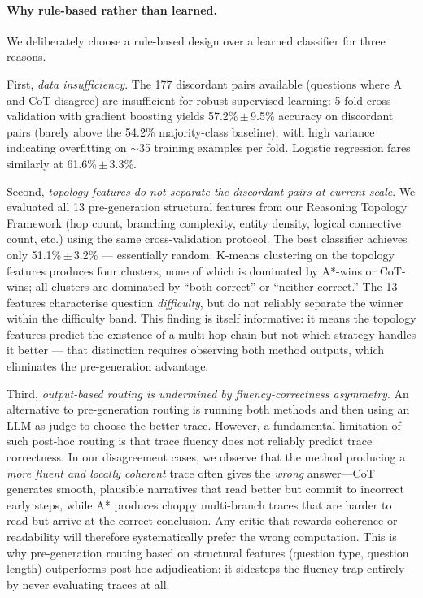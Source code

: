\documentclass{article}
\begin{document}
\paragraph{Why rule-based rather than learned.}
We deliberately choose a rule-based design over a learned classifier for three reasons.

First, \emph{data insufficiency}. The 177 discordant pairs available (questions where A\* and CoT disagree) are insufficient for robust supervised learning: 5-fold cross-validation with gradient boosting yields 57.2\%\,$\pm$\,9.5\% accuracy on discordant pairs (barely above the 54.2\% majority-class baseline), with high variance indicating overfitting on $\sim$35 training examples per fold. Logistic regression fares similarly at 61.6\%\,$\pm$\,3.3\%.

Second, \emph{topology features do not separate the discordant pairs at current scale}. We evaluated all 13 pre-generation structural features from our Reasoning Topology Framework (hop count, branching complexity, entity density, logical connective count, etc.) using the same cross-validation protocol. The best classifier achieves only 51.1\%\,$\pm$\,3.2\% --- essentially random. K-means clustering on the topology features produces four clusters, none of which is dominated by A*-wins or CoT-wins; all clusters are dominated by ``both correct'' or ``neither correct.'' The 13 features characterise question \emph{difficulty}, but do not reliably separate the winner within the difficulty band. This finding is itself informative: it means the topology features predict the existence of a multi-hop chain but not which strategy handles it better --- that distinction requires observing both method outputs, which eliminates the pre-generation advantage.

Third, \emph{output-based routing is undermined by fluency-correctness asymmetry}. An alternative to pre-generation routing is running both methods and then using an LLM-as-judge to choose the better trace. However, a fundamental limitation of such post-hoc routing is that trace fluency does not reliably predict trace correctness. In our disagreement cases, we observe that the method producing a \emph{more fluent and locally coherent} trace often gives the \emph{wrong} answer---CoT generates smooth, plausible narratives that read better but commit to incorrect early steps, while A* produces choppy multi-branch traces that are harder to read but arrive at the correct conclusion. Any critic that rewards coherence or readability will therefore systematically prefer the wrong computation. This is why pre-generation routing based on structural features (question type, question length) outperforms post-hoc adjudication: it sidesteps the fluency trap entirely by never evaluating traces at all.
\end{document}
